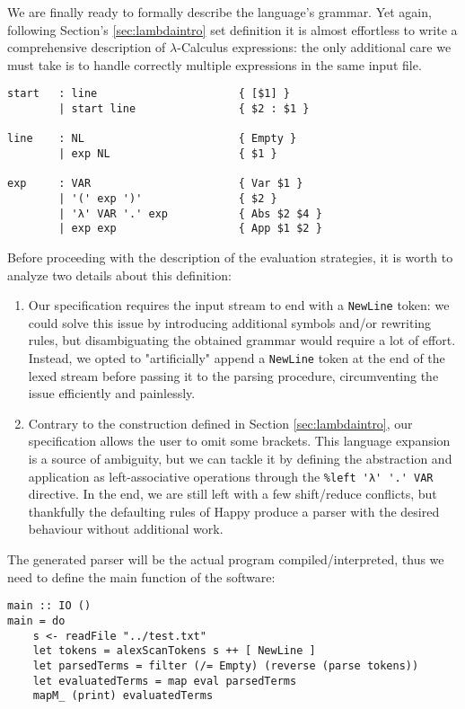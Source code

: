 \documentclass{article}
\begin{document}
We are finally ready to formally describe the language's grammar. Yet again, following Section's \ref{sec:lambdaintro} set definition it is almost effortless to write a comprehensive description of $\lambda$-Calculus expressions: the only additional care we must take is to handle correctly multiple expressions in the same input file.

\begin{lstlisting}
start   : line                      { [$1] }
        | start line                { $2 : $1 }

line    : NL                        { Empty }
        | exp NL                    { $1 }

exp     : VAR                       { Var $1 }
        | '(' exp ')'               { $2 }
        | 'λ' VAR '.' exp           { Abs $2 $4 }
        | exp exp                   { App $1 $2 }
\end{lstlisting}

Before proceeding with the description of the evaluation strategies, it is worth to analyze two details about this definition:

\begin{enumerate}
    \item Our specification requires the input stream to end with a \lstinline|NewLine| token: we could solve this issue by introducing additional symbols and/or rewriting rules, but disambiguating the obtained grammar would require a lot of effort. Instead, we opted to "artificially" append a \lstinline|NewLine| token at the end of the lexed stream before passing it to the parsing procedure, circumventing the issue efficiently and painlessly.
    \item Contrary to the construction defined in Section \ref{sec:lambdaintro}, our specification allows the user to omit some brackets. This language expansion is a source of ambiguity, but we can tackle it by defining the abstraction and application as left-associative operations through the \lstinline|%left 'λ' '.' VAR| directive. In the end, we are still left with a few shift/reduce conflicts, but thankfully the defaulting rules of Happy produce a parser with the desired behaviour without additional work.
\end{enumerate}

The generated parser will be the actual program compiled/interpreted, thus we need to define the main function of the software:

\begin{lstlisting}
main :: IO ()
main = do
    s <- readFile "../test.txt"
    let tokens = alexScanTokens s ++ [ NewLine ]
    let parsedTerms = filter (/= Empty) (reverse (parse tokens))
    let evaluatedTerms = map eval parsedTerms
    mapM_ (print) evaluatedTerms
\end{lstlisting}
\end{document}
